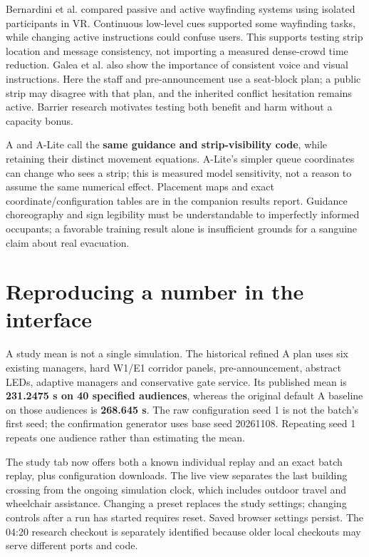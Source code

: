 \documentclass[11pt,a4paper]{article}
\begin{document}
Bernardini et al. \cite{R20} compared passive and active wayfinding systems using isolated participants in VR. Continuous low-level cues supported some wayfinding tasks, while changing active instructions could confuse users. This supports testing strip location and message consistency, not importing a measured dense-crowd time reduction. Galea et al. \cite{R8} also show the importance of consistent voice and visual instructions. Here the staff and pre-announcement use a seat-block plan; a public strip may disagree with that plan, and the inherited conflict hesitation remains active. Barrier research \cite{R11,R12,R17} motivates testing both benefit and harm without a capacity bonus.


A and A-Lite call the \textbf{same guidance and strip-visibility code}, while retaining their distinct movement equations. A-Lite's simpler queue coordinates can change who sees a strip; this is measured model sensitivity, not a reason to assume the same numerical effect. Placement maps and exact coordinate/configuration tables are in the companion results report. Guidance choreography and sign legibility must be understandable to imperfectly informed occupants; a favorable training result alone is insufficient grounds for a sanguine claim about real evacuation.


\section{Reproducing a number in the interface}\label{sec:21}

A study mean is not a single simulation. The historical refined A plan uses six existing managers, hard W1/E1 corridor panels, pre-announcement, abstract LEDs, adaptive managers and conservative gate service. Its published mean is \textbf{231.2475 s on 40 specified audiences}, whereas the original default A baseline on those audiences is \textbf{268.645 s}. The raw configuration seed 1 is not the batch's first seed; the confirmation generator uses base seed 20261108. Repeating seed 1 repeats one audience rather than estimating the mean.


The study tab now offers both a known individual replay and an exact batch replay, plus configuration downloads. The live view separates the last building crossing from the ongoing simulation clock, which includes outdoor travel and wheelchair assistance. Changing a preset replaces the study settings; changing controls after a run has started requires reset. Saved browser settings persist. The 04:20 research checkout is separately identified because older local checkouts may serve different ports and code.
\end{document}
